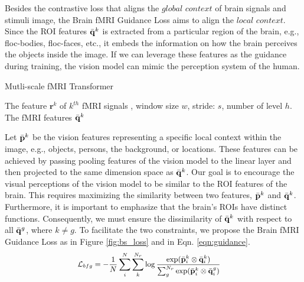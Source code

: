 Besides the contrastive loss that aligns the $\textit{global context}$ of brain signals and stimuli image, the Brain fMRI Guidance Loss aims to align the $\textit{local context}$. Since the ROI features $\Bar{\mathbf{q}}^k$ is extracted from a particular region of the brain, e.g., floc-bodies, floc-faces, etc., it embeds the information on how the brain perceives the objects inside the image.
If we can leverage these features as the guidance during training, 
the vision model can mimic the perception system of the human. 
\begin{algorithm}[!t]
\centering
\small
\caption{Mutli-scale fMRI Transformer}
\label{algo:sht}
\begin{algorithmic}[1]
 The feature $\mathbf{r}^k$ of $k^{th}$ fMRI signals , window size $w$, stride: $s$, number of level $h$. 
 The fMRI features $\Bar{\mathbf{q}}^k$


     \hfill {}
         \hfill {}
         \hfill {}
    \ENDFOR
\ENDFOR
{}
\end{algorithmic}
\end{algorithm}

Let $\Bar{\mathbf{p}}^k$ be the vision features representing a specific local context within the image, e.g., objects, persons, the background, or locations. These features can be achieved by passing pooling features of the vision model to the linear layer and then projected to the same dimension space as $\Bar{\mathbf{q}}^k$. Our goal is to encourage the visual perceptions of the vision model to be similar to the ROI features of the brain. This requires maximizing the similarity between two features, $\Bar{\mathbf{p}}^k$ and $\Bar{\mathbf{q}}^k$. Furthermore, it is important to emphasize that the brain's ROIs have distinct functions. Consequently, we must ensure the dissimilarity of $\Bar{\mathbf{q}}^k$ with respect to all $\Bar{\mathbf{q}}^{g}$, where $k \neq g$. To facilitate the two constraints, we propose the Brain fMRI Guidance Loss as in Figure \ref{fig:bs_loss} and in Eqn. \eqref{eqn:guidance}.
\begin{equation} \label{eqn:guidance}
\small
\begin{split}
    \mathcal{L}_{bfg} &= - \frac{1}{N} \sum_i^N \sum_k^{N_r} \log\frac{\exp(\Bar{\mathbf{p}}^k_i \otimes \Bar{\mathbf{q}}^k_i)}{\sum_g^{N_r}\exp(\Bar{\mathbf{p}}^k_i \otimes \Bar{\mathbf{q}}^g_i)}
\end{split}
\end{equation}

